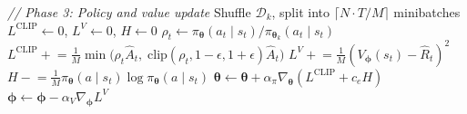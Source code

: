\documentclass[11pt]{article}
\begin{document}
\begin{algorithm}[p]
\begin{minipage}[t]{0.68\linewidth}
\begin{algorithmic}[1]
    \Statex \hspace{\algorithmicindent}\textit{// Phase 3: Policy and value update}
    \State Shuffle $\mathcal{D}_k$, split into $\lceil N \!\cdot\! T / M \rceil$ minibatches
            \State $L^{\text{CLIP}} \!\gets\! 0$, \; $L^{V} \!\gets\! 0$, \; $H \!\gets\! 0$
                \State $\rho_t \gets \pi_{\boldsymbol{\theta}}(a_t \mid s_t) / \pi_{\boldsymbol{\theta}_k}(a_t \mid s_t)$
                \State $L^{\text{CLIP}} \mathrel{+}= \frac{1}{M} \min\!\big(\rho_t \hat{A}_t,\; \text{clip}(\rho_t, 1{-}\epsilon, 1{+}\epsilon) \hat{A}_t\big)$
                \State $L^{V} \mathrel{+}= \frac{1}{M} (V_{\boldsymbol{\phi}}(s_t) - \hat{R}_t)^2$
                    \State $H \mathrel{-}= \frac{1}{M} \pi_{\boldsymbol{\theta}}(a \mid s_t) \log \pi_{\boldsymbol{\theta}}(a \mid s_t)$
                \EndFor
            \EndFor
            \State $\boldsymbol{\theta} \gets \boldsymbol{\theta} + \alpha_\pi \nabla_{\boldsymbol{\theta}} (L^{\text{CLIP}} + c_e H)$
            \State $\boldsymbol{\phi} \gets \boldsymbol{\phi} - \alpha_V \nabla_{\boldsymbol{\phi}} L^{V}$
        \EndFor
    \EndFor
\EndFor
\end{algorithmic}
\end{minipage}
\end{algorithm}
\end{document}
